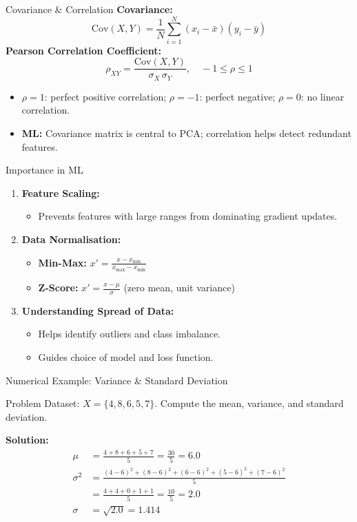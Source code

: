 \begin{frame}{Covariance \& Correlation}
\textbf{Covariance:}
\[
\mathrm{Cov}(X,Y) = \frac{1}{N}\sum_{i=1}^{N}(x_i - \bar{x})(y_i - \bar{y})
\]
\textbf{Pearson Correlation Coefficient:}
\[
\rho_{XY} = \frac{\mathrm{Cov}(X,Y)}{\sigma_X \, \sigma_Y}, \quad -1 \leq \rho \leq 1
\]
\begin{itemize}
    \item $\rho = 1$: perfect positive correlation; $\rho = -1$: perfect negative; $\rho = 0$: no linear correlation.
    \item \textbf{ML:} Covariance matrix is central to PCA; correlation helps detect redundant features.
\end{itemize}
\end{frame}

\begin{frame}{Importance in ML}
\begin{enumerate}
    \item \textbf{Feature Scaling:}
    \begin{itemize}
        \item Prevents features with large ranges from dominating gradient updates.
    \end{itemize}
    \item \textbf{Data Normalisation:}
    \begin{itemize}
        \item \textbf{Min-Max:} $x' = \frac{x - x_{\min}}{x_{\max} - x_{\min}}$
        \item \textbf{Z-Score:} $x' = \frac{x - \mu}{\sigma}$ \quad (zero mean, unit variance)
    \end{itemize}
    \item \textbf{Understanding Spread of Data:}
    \begin{itemize}
        \item Helps identify outliers and class imbalance.
        \item Guides choice of model and loss function.
    \end{itemize}
\end{enumerate}
\end{frame}

\begin{frame}{Numerical Example: Variance \& Standard Deviation}
\begin{exampleblock}{Problem}
Dataset: $X = \{4, 8, 6, 5, 7\}$. Compute the mean, variance, and standard deviation.
\end{exampleblock}
\textbf{Solution:}
\begin{align*}
\mu &= \frac{4+8+6+5+7}{5} = \frac{30}{5} = \mathbf{6.0}\\[4pt]
\sigma^2 &= \frac{(4-6)^2+(8-6)^2+(6-6)^2+(5-6)^2+(7-6)^2}{5}\\
         &= \frac{4+4+0+1+1}{5} = \frac{10}{5} = \mathbf{2.0}\\[4pt]
\sigma &= \sqrt{2.0} = \mathbf{1.414}
\end{align*}
\end{frame}

